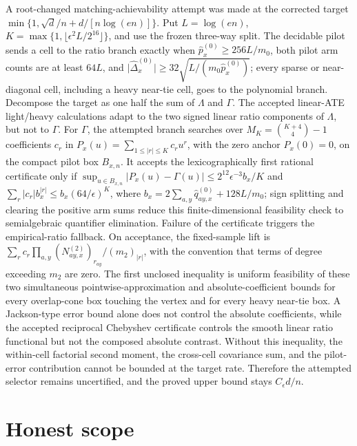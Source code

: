 \documentclass{article}
\begin{document}
A root-changed matching-achievability attempt was made at the corrected target \(\min\{1,\sqrt d/n+d/[n\log(en)]\}\). Put \(L=\log(en)\), \(K=\max\{1,\lfloor\epsilon^2L/2^{16}\rfloor\}\), and use the frozen three-way split. The decidable pilot sends a cell to the ratio branch exactly when \(\widehat p_x^{(0)}\ge256L/m_0\), both pilot arm counts are at least \(64L\), and \(\lvert\widehat\Delta_x^{(0)}\rvert\ge32\sqrt{L/(m_0\widehat p_x^{(0)})}\); every sparse or near-diagonal cell, including a heavy near-tie cell, goes to the polynomial branch. Decompose the target as one half the sum of \(\Lambda\) and \(\Gamma\). The accepted linear-ATE light/heavy calculations adapt to the two signed linear ratio components of \(\Lambda\), but not to \(\Gamma\). For \(\Gamma\), the attempted branch searches over \(M_K=\binom{K+4}{4}-1\) coefficients \(c_r\) in \(P_x(u)=\sum_{1\leq\lvert r\rvert\leq K}c_ru^r\), with the zero anchor \(P_x(0)=0\), on the compact pilot box \(B_{x,n}\). It accepts the lexicographically first rational certificate only if \(\sup_{u\in B_{x,n}}\lvert P_x(u)-\Gamma(u)\rvert\le2^{12}\epsilon^{-3}b_x/K\) and \(\sum_r\lvert c_r\rvert b_x^{\lvert r\rvert}\le b_x(64/\epsilon)^K\), where \(b_x=2\sum_{a,y}\widehat q^{(0)}_{ay,x}+128L/m_0\); sign splitting and clearing the positive arm sums reduce this finite-dimensional feasibility check to semialgebraic quantifier elimination. Failure of the certificate triggers the empirical-ratio fallback. On acceptance, the fixed-sample lift is \(\sum_r c_r\prod_{a,y}(N^{(2)}_{ay,x})_{r_{ay}}/(m_2)_{\lvert r\rvert}\), with the convention that terms of degree exceeding \(m_2\) are zero. The first unclosed inequality is uniform feasibility of these two simultaneous pointwise-approximation and absolute-coefficient bounds for every overlap-cone box touching the vertex and for every heavy near-tie box. A Jackson-type error bound alone does not control the absolute coefficients, while the accepted reciprocal Chebyshev certificate controls the smooth linear ratio functional but not the composed absolute contrast. Without this inequality, the within-cell factorial second moment, the cross-cell covariance sum, and the pilot-error contribution cannot be bounded at the target rate. Therefore the attempted selector remains uncertified, and the proved upper bound stays \(C_\epsilon d/n\).

\section{Honest scope}
\end{document}
